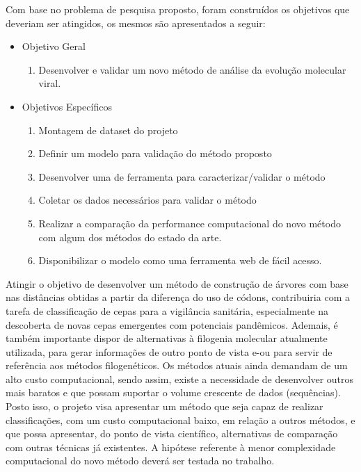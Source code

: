 Com base no problema de pesquisa proposto, foram construídos os objetivos que deveriam ser atingidos, os mesmos são apresentados a seguir:
\begin{itemize}
  \item Objetivo Geral
        \begin{enumerate}[label=~(\roman*)]
          \item Desenvolver e validar um novo método de análise da evolução molecular viral.
        \end{enumerate}
  \item Objetivos Específicos
        \begin{enumerate}[label=~(\roman*)]
          \item Montagem de dataset do projeto
          \item Definir um modelo para validação do método proposto
          \item Desenvolver uma de ferramenta para caracterizar/validar o método
          \item Coletar os dados necessários para validar o método
          \item Realizar a comparação da performance computacional do novo método com algum dos métodos do estado da arte.
          \item Disponibilizar o modelo como uma ferramenta web de fácil acesso.
        \end{enumerate}
\end{itemize}

Atingir o objetivo de desenvolver um método de construção de árvores com base nas distâncias obtidas a partir da diferença do uso de códons, contribuiria com a tarefa de classificação de cepas para a vigilância sanitária, especialmente na descoberta de novas cepas emergentes com potenciais pandêmicos. Ademais, é também importante dispor de alternativas à filogenia molecular atualmente utilizada, para gerar informações de outro ponto de vista e-ou para servir de referência aos métodos filogenéticos.
Os métodos atuais ainda demandam de um alto custo computacional, sendo assim, existe a necessidade de desenvolver outros mais baratos e que possam suportar o volume crescente de dados (sequências).
Posto isso, o projeto visa apresentar um método que seja capaz de realizar classificações, com um custo computacional baixo, em relação a outros métodos, e que possa apresentar, do ponto de vista científico, alternativas de comparação com outras técnicas já existentes. A hipótese referente à menor complexidade computacional do novo método deverá ser testada no trabalho.

